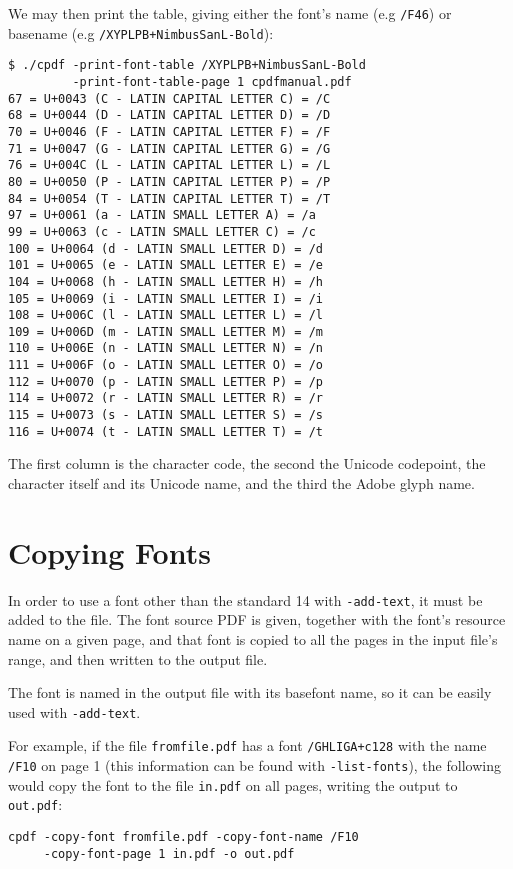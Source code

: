 \documentclass{book}
\begin{document}
We may then print the table, giving either the font's name (e.g \texttt{/F46}) or basename (e.g \texttt{/XYPLPB+NimbusSanL-Bold}):

{\small\begin{verbatim}
$ ./cpdf -print-font-table /XYPLPB+NimbusSanL-Bold
         -print-font-table-page 1 cpdfmanual.pdf
67 = U+0043 (C - LATIN CAPITAL LETTER C) = /C
68 = U+0044 (D - LATIN CAPITAL LETTER D) = /D
70 = U+0046 (F - LATIN CAPITAL LETTER F) = /F
71 = U+0047 (G - LATIN CAPITAL LETTER G) = /G
76 = U+004C (L - LATIN CAPITAL LETTER L) = /L
80 = U+0050 (P - LATIN CAPITAL LETTER P) = /P
84 = U+0054 (T - LATIN CAPITAL LETTER T) = /T
97 = U+0061 (a - LATIN SMALL LETTER A) = /a
99 = U+0063 (c - LATIN SMALL LETTER C) = /c
100 = U+0064 (d - LATIN SMALL LETTER D) = /d
101 = U+0065 (e - LATIN SMALL LETTER E) = /e
104 = U+0068 (h - LATIN SMALL LETTER H) = /h
105 = U+0069 (i - LATIN SMALL LETTER I) = /i
108 = U+006C (l - LATIN SMALL LETTER L) = /l
109 = U+006D (m - LATIN SMALL LETTER M) = /m
110 = U+006E (n - LATIN SMALL LETTER N) = /n
111 = U+006F (o - LATIN SMALL LETTER O) = /o
112 = U+0070 (p - LATIN SMALL LETTER P) = /p
114 = U+0072 (r - LATIN SMALL LETTER R) = /r
115 = U+0073 (s - LATIN SMALL LETTER S) = /s
116 = U+0074 (t - LATIN SMALL LETTER T) = /t
\end{verbatim}}

The first column is the character code, the second the Unicode codepoint, the character itself and its Unicode name, and the third the Adobe glyph name.

\section{Copying Fonts}
\label{copyfont}

In order to use a font other than the standard 14 with \verb!-add-text!, it
must be added to the file. The font source PDF is given, together with the
font's resource name on a given page, and that font is copied to all the pages
in the input file's range, and then written to the output file.

The font is named in the output file with its basefont name, so it can be
easily used with \verb!-add-text!.

For example, if the file \verb!fromfile.pdf! has a font \verb!/GHLIGA+c128! with
the name \verb!/F10! on page 1 (this information can be found with
\verb!-list-fonts!), the following would copy the font to the file
\verb!in.pdf! on all pages, writing the output to \verb!out.pdf!:
  \begin{framed}
  \small\noindent\verb!cpdf -copy-font fromfile.pdf -copy-font-name /F10!\\
  \small\noindent\verb!     -copy-font-page 1 in.pdf -o out.pdf!
  \end{framed}
\end{document}
